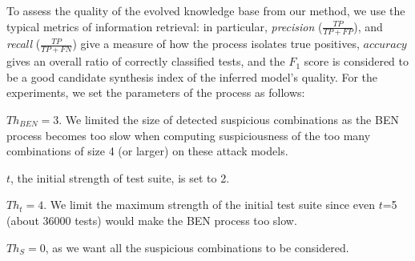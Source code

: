 \begin{tikzborder}{\cite{Gargantini16:validation}}
\begin{tikzborder}{\cite{gargantini_combinatorial_2017}}
\begin{tikzborder}{\cite{garn2019}}
\bb To assess the quality of the evolved knowledge base from our method, we use the typical metrics of information retrieval: in particular, \textit{precision} ($\frac{TP}{TP+FP}$), and \textit{recall} ($\frac{TP}{TP+FN}$) give a measure of how the process isolates true positives, $accuracy$ gives an overall ratio of correctly classified tests, and the $F_1$ score is considered to be a good candidate synthesis index of the inferred model's quality. 
For the experiments, we set the parameters of the process as follows:
\begin{compactitem}
\item $Th_{BEN}=3$. We limited the size of detected suspicious combinations as the BEN process becomes too slow when computing suspiciousness of the too many combinations of size 4 (or larger) on these attack models.
\item $t$, the initial strength of test suite, is set to 2.
\item $Th_t=4$. We limit the maximum strength of the initial test suite since even $t$=5 (about 36000 tests) would make the BEN process too slow.%
\item $Th_S=0$, as %
we want all the suspicious combinations to be considered. %
\end{compactitem}\be

\begin{table}[!hbt]
\setlength\tabcolsep{2.5pt}
\centering
\caption{Quality metrics for the inferred models ($Th_{BEN}=3$, and $Th_S=0$)}\label{tab:results}
\end{table}
\end{tikzborder}
\end{tikzborder}
\end{tikzborder}
